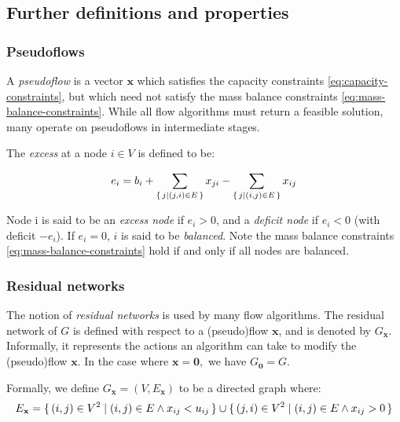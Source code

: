 \subsection{Further definitions and properties}


\subsubsection{Pseudoflows} \label{sec:prep-flow-pseudo}


A \emph{pseudoflow} is a vector $\mathbf{x}$ which satisfies the capacity constraints
\cref{eq:capacity-constraints}, but which need not satisfy the mass balance constraints \cref{eq:mass-balance-constraints}. While all flow algorithms must return a feasible solution, many operate on pseudoflows in intermediate stages. 

The \emph{excess} at a node $i\in V$ is defined to be:

\begin{equation}
e_i=b_i+\sum_{\set{j | (j,i)\in E}}x_{ji}-\sum_{\set{j | (i,j)\in E}}x_{ij}
\end{equation}

Node i is said to be an \emph{excess node} if $e_{i}>0$, and a \emph{deficit node} if $e_{i}<0$ (with deficit $-e_{i}$). If $e_{i}=0$, $i$ is said to be \emph{balanced}. Note the mass balance constraints \cref{eq:mass-balance-constraints} hold if and only if all nodes are balanced.

\subsubsection{Residual networks}


The notion of \emph{residual networks} is used by many flow algorithms. The residual network of $G$ is defined with respect to a (pseudo)flow $\mathbf{x}$, and is denoted by $G_{\mathbf{x}}$. Informally, it represents the actions an algorithm can take to modify the (pseudo)flow $\mathbf{x}$. In the case where $\mathbf{x=0},$ we have $G_{\mathbf{0}}=G$.

Formally, we define $G_{\mathbf{x}}=\left(V,E_{\mathbf{x}}\right)$ to be a directed graph where:
\begin{equation}
E_{\mathbf{x}}=\set{(i,j)\in V^{2} | (i,j)\in E\land x_{ij}<u_{ij}} \cup \set{(j,i)\in V^{2} | (i,j)\in E\land x_{ij}>0} 
\end{equation}

